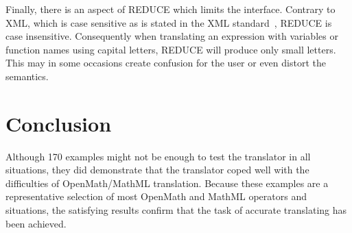 Finally, there is an aspect of REDUCE which limits the interface.
Contrary to XML, which is case sensitive as is stated in the XML
standard~\cite{xml}, REDUCE is case insensitive. Consequently when
translating an expression with variables or function names using
capital letters, REDUCE will produce only small letters.  This may in
some occasions create confusion for the user or even distort the
semantics.

\section{Conclusion}

Although 170 examples might not be enough to test the translator in all situations, they did demonstrate that the translator coped well with the
difficulties of OpenMath/MathML translation. Because these examples are a representative selection of most OpenMath and MathML operators and
situations, the satisfying results confirm that the task of accurate translating has been achieved.


